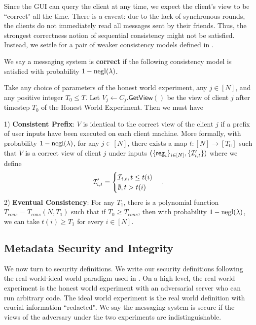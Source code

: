 Since the GUI can query the client at any time, we expect the client's view to be ``correct" all the time. There is a caveat: due to the lack of synchronous rounds, the clients do not immediately read all messages sent by their friends. Thus, the strongest correctness notion of sequential consistency might not be satisfied. Instead, we settle for a pair of weaker consistency models defined in \cite{doug13Consistency}. 
\begin{definition}
\label{defn:correctness}
 We say a messaging system is \textbf{correct} if the following consistency model is satisfied with probability $1 - \operatorname{negl}(\lambda)$.
 
 Take any choice of parameters of the honest world experiment, any $j \in [N]$, and any positive integer $T_0 \leq T$. Let $V_j \leftarrow C_j.\mathsf{GetView}()$ be the view of client $j$ after timestep $T_0$ of the Honest World Experiment. Then we must have

1) \textbf{Consistent Prefix}: $V$ is identical to the correct view of the client $j$ if a prefix of user inputs have been executed on each client machine. More formally, with probability $1 - \operatorname{negl}(\lambda)$, for any $j \in [N]$, there exists a map $t: [N] \to [T_0]$ such that  $V$ is a correct view of client $j$ under inputs $(\{\mathsf{reg}_i\}_{i \in [N]}, \{\mathcal{I}'_{i, t}\})$
where we define
$$\mathcal{I}'_{i, t} = \begin{cases}
\mathcal{I}_{i, t}, t \leq t(i) \\
\emptyset, t > t(i)
\end{cases}.$$
2) \textbf{Eventual Consistency}: For any $T_1$, there is a polynomial function $T_{cons} = T_{cons}(N, T_1)$ such that if $T_0 \geq T_{cons}$, then with probability $1 - \operatorname{negl}(\lambda)$, we can take $t(i) \geq T_1$ for every $i \in [N]$.
\end{definition}

\subsection{Metadata Security and Integrity}
\label{subsec:messaging-security-integrity}
We now turn to security definitions. We write our security definitions following the real world-ideal world paradigm used in \cite[Section 2.2]{shi2021non}. On a high level, the real world experiment is the honest world experiment with an adversarial server who can run arbitrary code. The ideal world experiment is the real world definition with crucial information ``redacted". We say the messaging system is secure if the views of the adversary under the two experiments are indistinguishable.


